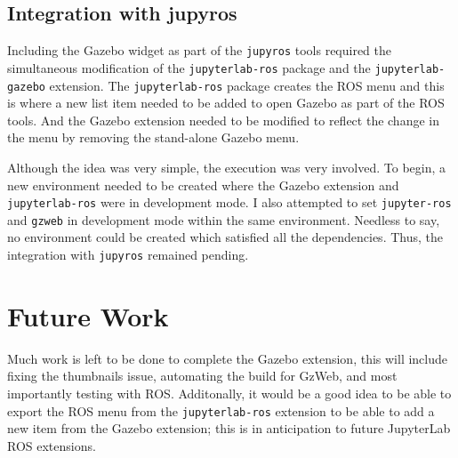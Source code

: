 \subsection{Integration with jupyros}

    Including the Gazebo widget as part of the \texttt{jupyros} tools required the simultaneous modification of the \texttt{jupyterlab-ros} package and the \texttt{jupyterlab-gazebo} extension. The \texttt{jupyterlab-ros} package creates the ROS menu and this is where a new list item needed to be added to open Gazebo as part of the ROS tools. And the Gazebo extension needed to be modified to reflect the change in the menu by removing the stand-alone Gazebo menu. 
    
    Although the idea was very simple, the execution was very involved. To begin, a new environment needed to be created where the Gazebo extension and \texttt{jupyterlab-ros} were in development mode. I also attempted to set \texttt{jupyter-ros} and \texttt{gzweb} in development mode within the same environment. Needless to say, no environment could be created which satisfied all the dependencies. Thus, the integration with \texttt{jupyros} remained pending.

\section{Future Work}

    Much work is left to be done to complete the Gazebo extension, this will include fixing the thumbnails issue, automating the build for GzWeb, and most importantly testing with ROS. Additonally, it would be a good idea to be able to export the ROS menu from the \texttt{jupyterlab-ros} extension to be able to add a new item from the Gazebo extension; this is in anticipation to future JupyterLab ROS extensions.

